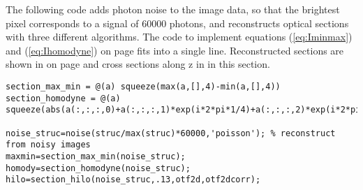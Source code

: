 \vspace{-6.5cm}\hspace{12cm} 

\vspace{1.5cm} The following code adds photon noise to the image data,
so that the brightest pixel corresponds to a signal of 60000 photons,
and reconstructs optical sections with three different algorithms. The
code to implement equations (\ref{eq:Iminmax}) and
(\ref{eq:Ihomodyne}) on page \pageref{eq:Iminmax} fits into a single
line. Reconstructed sections are shown in
 on page
\pageref{fig:hilo-sec-comparison} and cross sections along z in
 in this section.
\begin{lstlisting}[style=mymatlab]
section_max_min = @(a) squeeze(max(a,[],4)-min(a,[],4))
section_homodyne = @(a) squeeze(abs(a(:,:,:,0)+a(:,:,:,1)*exp(i*2*pi*1/4)+a(:,:,:,2)*exp(i*2*pi*2/4)+a(:,:,:,3)*exp(i*2*pi*3/4)))

noise_struc=noise(struc/max(struc)*60000,'poisson'); % reconstruct from noisy images
maxmin=section_max_min(noise_struc);
homody=section_homodyne(noise_struc);
hilo=section_hilo(noise_struc,.13,otf2d,otf2dcorr);
\end{lstlisting}

